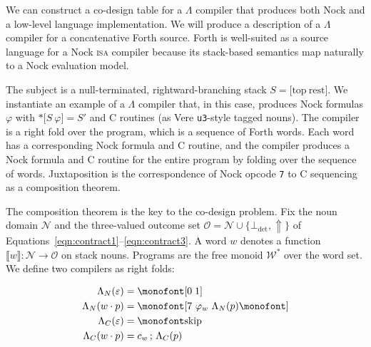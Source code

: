 \documentclass[twoside]{article}
\begin{document}
We can construct a co-design table for a $\Lambda$ compiler that produces both Nock and a low-level language implementation.  We will produce a description of a $\Lambda$ compiler for a concatenative Forth source.  Forth is well-suited as a source language for a Nock \textsc{isa} compiler because its stack-based semantics map naturally to a Nock evaluation model.

The subject is a null-terminated, rightward-branching stack $S = \texttt{[}\textrm{top}\ \textrm{rest}\texttt{]}$.  We instantiate an example of a $\Lambda$ compiler that, in this case, produces Nock formulas $\varphi$ with $\texttt{*[}S\ \varphi\texttt{]} = S'$ and C routines (as Vere \lstinline[style=inlinecode]{u3}-style tagged nouns).  The compiler is a right fold over the program, which is a sequence of Forth words.  Each word has a corresponding Nock formula and C routine, and the compiler produces a Nock formula and C routine for the entire program by folding over the sequence of words.  Juxtaposition is the correspondence of Nock opcode \lstinline[style=inlinecode]{7} to C sequencing as a composition theorem.

The composition theorem is the key to the co-design problem.  Fix the noun domain $\mathcal{N}$ and the three-valued outcome set $\mathcal{O} = \mathcal{N} \cup \{\bot_\text{det}, \Uparrow\}$ of Equations~\ref{eqn:contract1}--\ref{eqn:contract3}.  A word $w$ denotes a function $\llbracket w \rrbracket : \mathcal{N} \to \mathcal{O}$ on stack nouns.  Programs are the free monoid $\mathcal{W}^*$ over the word set.  We define two compilers as right folds:

\begin{subequations} %
  \begin{align}
    \Lambda_N(\varepsilon) &= \texttt{[0\;1]} \label{eqn:compiler_N1} \\
    \Lambda_N(w \cdot p) &= \texttt{[7\ }\varphi_w\ \Lambda_N(p)\texttt{]} \label{eqn:compiler_N2} \\
    \Lambda_C(\varepsilon) &= \texttt{skip}  \label{eqn:compiler_C1} \\
    \Lambda_C(w \cdot p) &= c_w\,;\, \Lambda_C(p) \label{eqn:compiler_C2}
  \end{align}
\end{subequations}
\end{document}
